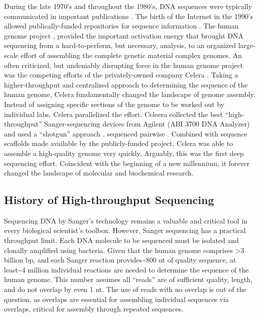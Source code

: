     During the late 1970’s and throughout the 1980’s, DNA sequences were typically communicated in important publications \citep{Cordell1980a,Sanger1978a}. The birth of the Internet in the 1990’s allowed publically-funded repositories for sequence information \citep{Benson2011a}. The human genome project \citep{Lander2011a,Venter2001}, provided the important activation energy that brought DNA sequencing from a hard-to-perform, but necessary, analysis, to an organized large-scale effort of assembling the complete genetic material complex genomes. An often criticized, but undeniably disrupting force in the human genome project was the competing efforts of the privately-owned company Celera \citep{Venter2008a}. Taking a higher-throughput and centralized approach to determining the sequence of the human genome, Celera fundamentally changed the landscape of genome assembly. Instead of assigning specific sections of the genome to be worked out by individual labs, Celera parallelized the effort. Celeera collected the best ``high-throughput'' Sanger-sequencing devices from Agilent (ABI 3700 DNA Analyzer) and used a ``shotgun'' approach \citep{Staden1979}, sequenced pairwise \citep{Roach1995}. Combined with sequence scaffolds made available by the publicly-funded project, Celera was able to assemble a high-quality genome very quickly. Arguably, this was the first deep sequencing effort. Coincident with the beginning of a new millennium, it forever changed the landscape of molecular and biochemical research.

  \subsection{History of High-throughput Sequencing}
    \label{Intro:subsec: History of HTS}

    Sequencing DNA by Sanger’s technology remains a valuable and critical tool in every biological scientist’s toolbox. However, Sanger sequencing has  a practical throughput limit. Each DNA molecule to be sequenced must be isolated and clonally amplified using bacteria. Given that the human genome \citep{Hattori2005a} comprises >3 billion bp, and each Sanger reaction provides\textasciitilde800 nt of quality sequence, at least\textasciitilde4 million individual reactions are needed to determine the sequence of the human genome. This number assumes all ``reads'' are of sufficient quality, length, and do not overlap by even 1 nt. The use of reads with no overlap is out of the question, as overlaps are essential for assembling individual sequences via overlaps, critical for assembly through repeated sequences. 

